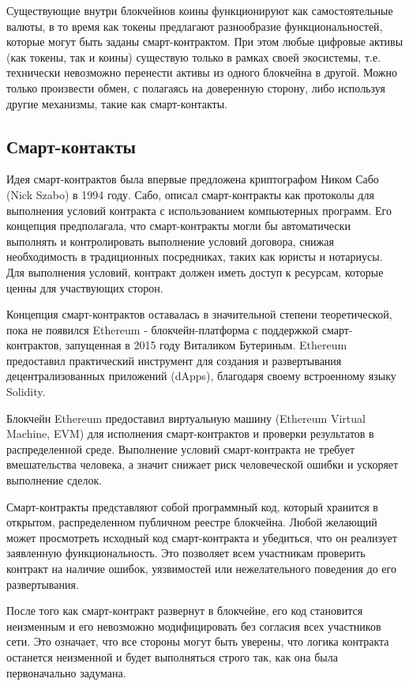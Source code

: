 Существующие внутри блокчейнов коины функционируют как самостоятельные валюты, в то время как токены предлагают разнообразие функциональностей, которые могут быть заданы смарт-контрактом. При этом любые цифровые активы (как токены, так и коины) существую только в рамках своей экосистемы, т.е. технически невозможно перенести активы из одного блокчейна в другой. Можно только произвести обмен, с полагаясь на доверенную сторону, либо используя другие механизмы, такие как смарт-контакты.

\subsection{Смарт-контакты}

Идея смарт-контрактов была впервые предложена криптографом Ником Сабо (Nick Szabo) в 1994 году. Сабо, описал смарт-контракты как протоколы для выполнения условий контракта с использованием компьютерных программ. Его концепция предполагала, что смарт-контракты могли бы автоматически выполнять и контролировать выполнение условий договора, снижая необходимость в традиционных посредниках, таких как юристы и нотариусы. Для выполнения условий, контракт должен иметь доступ к ресурсам, которые ценны для участвующих сторон.

Концепция смарт-контрактов оставалась в значительной степени теоретической, пока не появился Ethereum - блокчейн-платформа с поддержкой смарт-контрактов, запущенная в 2015 году Виталиком Бутериным. Ethereum предоставил практический инструмент для создания и развертывания децентрализованных приложений (dApps), благодаря своему встроенному языку Solidity.

Блокчейн Ethereum предоставил виртуальную машину (Ethereum Virtual Machine, EVM) для исполнения смарт-контрактов и проверки результатов в распределенной среде. Выполнение условий смарт-контракта не требует вмешательства человека, а значит снижает риск человеческой ошибки и ускоряет выполнение сделок.

Смарт-контракты представляют собой программный код, который хранится в открытом, распределенном публичном реестре блокчейна. Любой желающий может просмотреть исходный код смарт-контракта и убедиться, что он реализует заявленную функциональность. Это позволяет всем участникам проверить контракт на наличие ошибок, уязвимостей или нежелательного поведения до его развертывания.

После того как смарт-контракт развернут в блокчейне, его код становится неизменным и его невозможно модифицировать без согласия всех участников сети. Это означает, что все стороны могут быть уверены, что логика контракта останется неизменной и будет выполняться строго так, как она была первоначально задумана.

